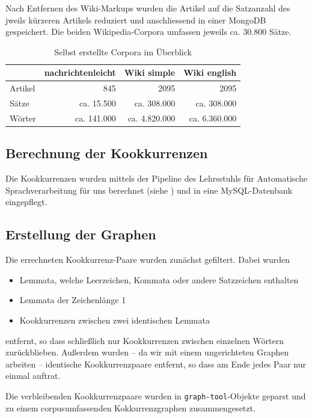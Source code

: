 \documentclass[11pt, a4paper]{article}
\begin{document}
Nach Entfernen des Wiki-Markups wurden die Artikel auf die Satzanzahl
des jweils k\"urzeren Artikels reduziert und anschliessend in einer MongoDB
gespeichert.
Die beiden Wikipedia-Corpora umfassen jeweils ca. 30.800 Sätze.

\begin{table}[ht]
  \centering
  \begin{tabular}{lrrr}
    \toprule
                &  nachrichtenleicht & Wiki simple   & Wiki english\\
    \midrule
    Artikel     & 845                & 2095          & 2095\\
    Sätze       & ca. 15.500         & ca. 308.000   & ca. 308.000\\
    Wörter      & ca. 141.000        & ca. 4.820.000 & ca. 6.360.000\\
    \bottomrule
  \end{tabular}
  \caption{\label{tab:corpora} Selbst erstellte Corpora im Überblick}
\end{table}


\subsection{Berechnung der Kookkurrenzen}

Die Kookkurrenzen wurden mittels der Pipeline des Lehrsstuhls f\"ur
Automatische Sprachverarbeitung für uns berechnet (siehe \cite{Quasthoff2006})
und in eine MySQL-Datenbank eingepflegt.


\subsection{Erstellung der Graphen}

Die errechneten Kookkurrenz-Paare wurden zunächst gefiltert. Dabei wurden 
\begin{itemize}
    \item Lemmata, welche Leerzeichen, Kommata oder andere Satzzeichen enthalten
    \item Lemmata der Zeichenlänge 1
    \item Kookkurrenzen zwischen zwei identischen Lemmata
\end{itemize}
entfernt, so dass schließlich nur Kookkurrenzen zwischen einzelnen Wörtern
zurückblieben.
Außerdem wurden -- da wir mit einem ungerichteten Graphen arbeiten -- identische
Kookkurrenzpaare entfernt, so dass am Ende jedes Paar nur einmal auftrat.

Die verbleibenden Kookkurrenzpaare wurden in \texttt{graph-tool}-Objekte geparst
und zu einem corpusumfassenden Kokkurrenzgraphen zusammengesetzt.
\end{document}
